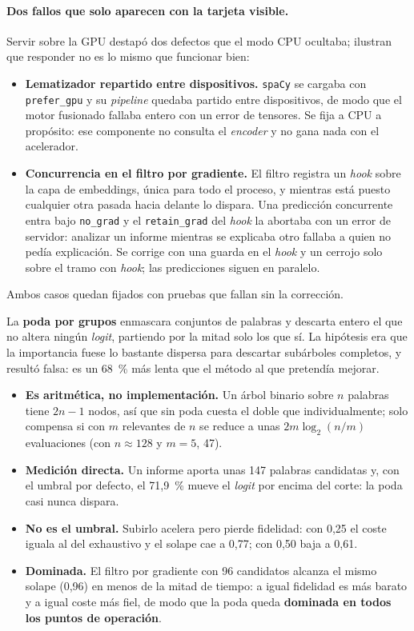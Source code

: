 \paragraph{Dos fallos que solo aparecen con la tarjeta visible.}
Servir sobre la GPU destapó dos defectos que el modo CPU ocultaba; ilustran que responder no es lo mismo que funcionar bien:

\begin{itemize}
 \item \textbf{Lematizador repartido entre dispositivos.} \texttt{spaCy} se cargaba con \texttt{prefer\_gpu} y su \emph{pipeline} quedaba partido entre dispositivos, de modo que el motor fusionado fallaba entero con un error de tensores. Se fija a CPU a propósito: ese componente no consulta el \emph{encoder} y no gana nada con el acelerador.
 \item \textbf{Concurrencia en el filtro por gradiente.} El filtro registra un \emph{hook} sobre la capa de embeddings, única para todo el proceso, y mientras está puesto cualquier otra pasada hacia delante lo dispara. Una predicción concurrente entra bajo \texttt{no\_grad} y el \texttt{retain\_grad} del \emph{hook} la abortaba con un error de servidor: analizar un informe mientras se explicaba otro fallaba a quien no pedía explicación. Se corrige con una guarda en el \emph{hook} y un cerrojo solo sobre el tramo con \emph{hook}; las predicciones siguen en paralelo.
\end{itemize}

Ambos casos quedan fijados con pruebas que fallan sin la corrección.

La \textbf{poda por grupos} enmascara conjuntos de palabras y descarta entero el que no altera ningún \emph{logit}, partiendo por la mitad solo los que sí. La hipótesis era que la importancia fuese lo bastante dispersa para descartar subárboles completos, y resultó falsa: es un 68~\% más lenta que el método al que pretendía mejorar.

\begin{itemize}
 \item \textbf{Es aritmética, no implementación.} Un árbol binario sobre $n$ palabras tiene $2n-1$ nodos, así que sin poda cuesta el doble que individualmente; solo compensa si con $m$ relevantes de $n$ se reduce a unas $2m\log_2(n/m)$ evaluaciones (con $n \approx 128$ y $m = 5$, 47).
 \item \textbf{Medición directa.} Un informe aporta unas 147 palabras candidatas y, con el umbral por defecto, el 71,9~\% mueve el \emph{logit} por encima del corte: la poda casi nunca dispara.
 \item \textbf{No es el umbral.} Subirlo acelera pero pierde fidelidad: con 0,25 el coste iguala al del exhaustivo y el solape cae a 0,77; con 0,50 baja a 0,61.
 \item \textbf{Dominada.} El filtro por gradiente con 96 candidatos alcanza el mismo solape (0,96) en menos de la mitad de tiempo: a igual fidelidad es más barato y a igual coste más fiel, de modo que la poda queda \textbf{dominada en todos los puntos de operación}.
\end{itemize}

